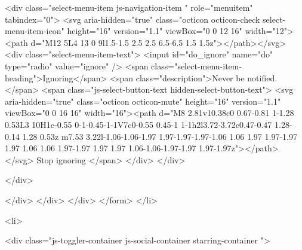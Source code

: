                 <div class="select-menu-item js-navigation-item " role="menuitem" tabindex="0">
                  <svg aria-hidden="true" class="octicon octicon-check select-menu-item-icon" height="16" version="1.1" viewBox="0 0 12 16" width="12"><path d="M12 5L4 13 0 9l1.5-1.5 2.5 2.5 6.5-6.5 1.5 1.5z"></path></svg>
                  <div class="select-menu-item-text">
                    <input id="do_ignore" name="do" type="radio" value="ignore" />
                    <span class="select-menu-item-heading">Ignoring</span>
                    <span class="description">Never be notified.</span>
                    <span class="js-select-button-text hidden-select-button-text">
                      <svg aria-hidden="true" class="octicon octicon-mute" height="16" version="1.1" viewBox="0 0 16 16" width="16"><path d="M8 2.81v10.38c0 0.67-0.81 1-1.28 0.53L3 10H1c-0.55 0-1-0.45-1-1V7c0-0.55 0.45-1 1-1h2l3.72-3.72c0.47-0.47 1.28-0.14 1.28 0.53z m7.53 3.22l-1.06-1.06-1.97 1.97-1.97-1.97-1.06 1.06 1.97 1.97-1.97 1.97 1.06 1.06 1.97-1.97 1.97 1.97 1.06-1.06-1.97-1.97 1.97-1.97z"></path></svg>
                      Stop ignoring
                    </span>
                  </div>
                </div>

              </div>

            </div>
          </div>
        </div>
</form>
  </li>

  <li>
    
  <div class="js-toggler-container js-social-container starring-container ">

